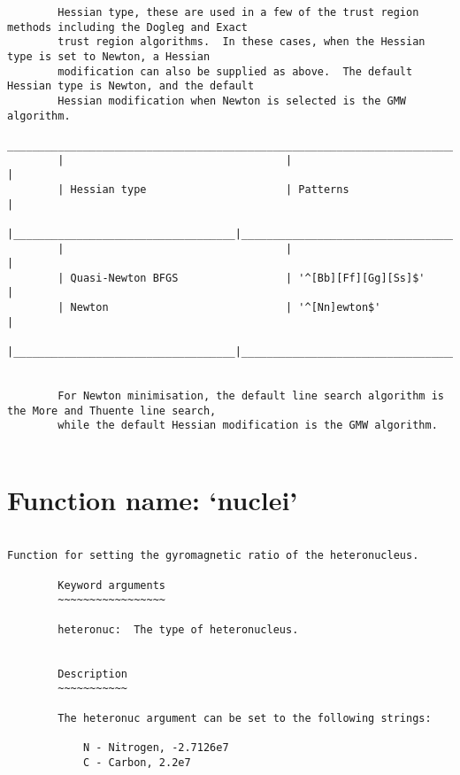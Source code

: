 \begin{verbatim}
        Hessian type, these are used in a few of the trust region methods including the Dogleg and Exact
        trust region algorithms.  In these cases, when the Hessian type is set to Newton, a Hessian
        modification can also be supplied as above.  The default Hessian type is Newton, and the default
        Hessian modification when Newton is selected is the GMW algorithm.
        ___________________________________________________________________________________________
        |                                   |                                                     |
        | Hessian type                      | Patterns                                            |
        |___________________________________|_____________________________________________________|
        |                                   |                                                     |
        | Quasi-Newton BFGS                 | '^[Bb][Ff][Gg][Ss]$'                                |
        | Newton                            | '^[Nn]ewton$'                                       |
        |___________________________________|_____________________________________________________|
    
    
        For Newton minimisation, the default line search algorithm is the More and Thuente line search,
        while the default Hessian modification is the GMW algorithm.
        

\end{verbatim}

\normalsize
\section{Function name: `nuclei'}

\scriptsize
\begin{verbatim}

Function for setting the gyromagnetic ratio of the heteronucleus.

        Keyword arguments
        ~~~~~~~~~~~~~~~~~

        heteronuc:  The type of heteronucleus.


        Description
        ~~~~~~~~~~~

        The heteronuc argument can be set to the following strings:

            N - Nitrogen, -2.7126e7
            C - Carbon, 2.2e7
        
\end{verbatim}

